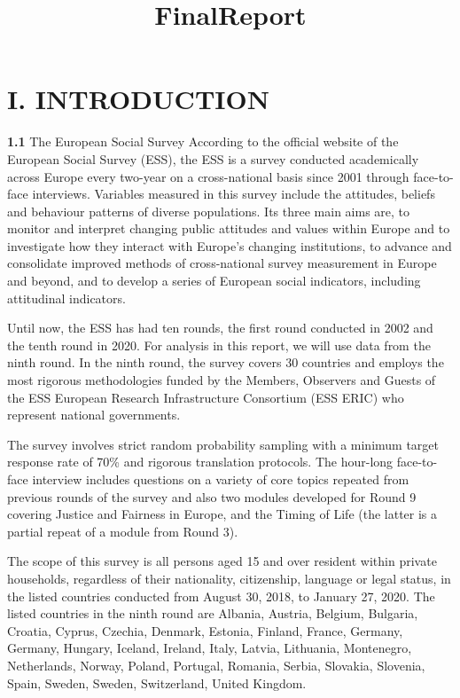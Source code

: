 \documentclass[
]{article}
\title{FinalReport}
\author{}
\date{\vspace{-2.5em}}
\begin{document}
\maketitle

\hypertarget{i.-introduction}{%
\section{I. INTRODUCTION}\label{i.-introduction}}

\textbf{1.1} The European Social Survey According to the official
website of the European Social Survey (ESS), the ESS is a survey
conducted academically across Europe every two-year on a cross-national
basis since 2001 through face-to-face interviews. Variables measured in
this survey include the attitudes, beliefs and behaviour patterns of
diverse populations. Its three main aims are, to monitor and interpret
changing public attitudes and values within Europe and to investigate
how they interact with Europe's changing institutions, to advance and
consolidate improved methods of cross-national survey measurement in
Europe and beyond, and to develop a series of European social
indicators, including attitudinal indicators.

Until now, the ESS has had ten rounds, the first round conducted in 2002
and the tenth round in 2020. For analysis in this report, we will use
data from the ninth round. In the ninth round, the survey covers 30
countries and employs the most rigorous methodologies funded by the
Members, Observers and Guests of the ESS European Research
Infrastructure Consortium (ESS ERIC) who represent national governments.

The survey involves strict random probability sampling with a minimum
target response rate of 70\% and rigorous translation protocols. The
hour-long face-to-face interview includes questions on a variety of core
topics repeated from previous rounds of the survey and also two modules
developed for Round 9 covering Justice and Fairness in Europe, and the
Timing of Life (the latter is a partial repeat of a module from Round
3).

The scope of this survey is all persons aged 15 and over resident within
private households, regardless of their nationality, citizenship,
language or legal status, in the listed countries conducted from August
30, 2018, to January 27, 2020. The listed countries in the ninth round
are Albania, Austria, Belgium, Bulgaria, Croatia, Cyprus, Czechia,
Denmark, Estonia, Finland, France, Germany, Germany, Hungary, Iceland,
Ireland, Italy, Latvia, Lithuania, Montenegro, Netherlands, Norway,
Poland, Portugal, Romania, Serbia, Slovakia, Slovenia, Spain, Sweden,
Sweden, Switzerland, United Kingdom.
\end{document}
